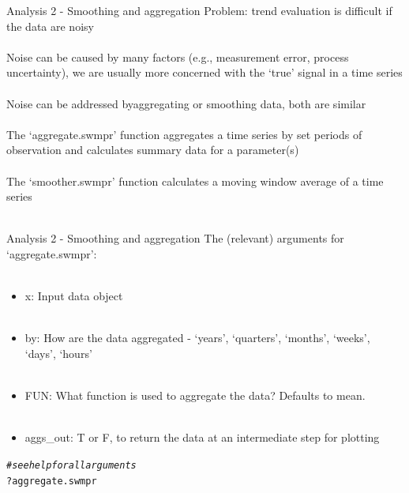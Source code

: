 \documentclass[xcolor=svgnames]{beamer}\usepackage[]{graphicx}\usepackage[]{color}
\makeatletter
\newcommand{\hlcom}[1]{\textcolor[rgb]{0.678,0.584,0.686}{\textit{#1}}}%
\newcommand{\hlopt}[1]{\textcolor[rgb]{0,0,0}{#1}}%
\newcommand{\hlstd}[1]{\textcolor[rgb]{0.345,0.345,0.345}{#1}}%
\newenvironment{kframe}{%
 \def\at@end@of@kframe{}%
 \ifinner\ifhmode%
  \def\at@end@of@kframe{\end{minipage}}%
  \begin{minipage}{\columnwidth}%
 \fi\fi%
 \def\FrameCommand##1{\hskip\@totalleftmargin \hskip-\fboxsep
 \colorbox{shadecolor}{##1}\hskip-\fboxsep
     \hskip-\linewidth \hskip-\@totalleftmargin \hskip\columnwidth}%
 \MakeFramed {\advance\hsize-\width
   \@totalleftmargin\z@ \linewidth\hsize
   \@setminipage}}%
 {\par\unskip\endMakeFramed%
 \at@end@of@kframe}
\newenvironment{knitrout}{}{} %
\makeatother
\begin{document}
\begin{frame}[containsverbatim]{Analysis 2 - Smoothing and aggregation}
\alert{Problem}: trend evaluation is difficult if the data are noisy \\~\\
Noise can be caused by many factors (e.g., measurement error, process uncertainty), we are usually more concerned with the `true' signal in a time series \\~\\
Noise can be addressed by\alert{aggregating} or \alert{smoothing} data, both are similar \\~\\
The \alert{`aggregate.swmpr'} function aggregates a time series by set periods of observation and calculates summary data for a parameter(s) \\~\\
The \alert{`smoother.swmpr'} function calculates a moving window average of a time series \\~\\
\end{frame}

\begin{frame}[containsverbatim]{Analysis 2 - Smoothing and aggregation}
The (relevant) arguments for `aggregate.swmpr':\\~\\
\begin{itemize}
\item x: Input data object \\~\\
\item by: How are the data aggregated - `years', `quarters', `months', `weeks', `days', `hours' \\~\\
\item FUN: What function is used to aggregate the data? Defaults to mean.\\~\\
\item aggs\_out: T or F, to return the data at an intermediate step for plotting
\end{itemize}
\begin{knitrout}\scriptsize
{}\color{fgcolor}\begin{kframe}
\begin{alltt}
\hlcom{# see help for all arguments}
\hlopt{?}\hlstd{aggregate.swmpr}
\end{alltt}
\end{kframe}
\end{knitrout}
\end{frame}
\end{document}
